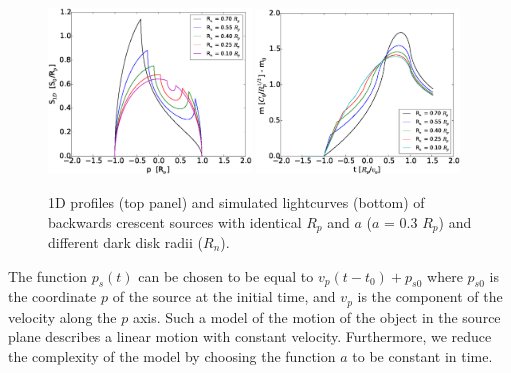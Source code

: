 \documentclass[usenatbib]{mn2e}
\begin{document}
\begin{figure}
\centering
    \includegraphics[width = 0.48\textwidth]{figures/S1D_var_rn_a_poz.eps}
    \includegraphics[width = 0.48\textwidth]{figures/5Rn_back_var_magnification.eps}
\caption{\label{fig:lightcurve_crescent_back} 1D profiles (top panel) and simulated lightcurves (bottom) of backwards crescent sources with identical $R_p$ and $a$ ($a$ = 0.3 $R_p$) and different dark disk radii ($R_n$).}
\end{figure}

The function $p_s(t)$ can be chosen to be equal to $v_p(t-t_0) + p_{s0}$ where $p_{s0}$ is the coordinate $p$ 
of the source at the initial time, and $v_p$ is the component of the velocity
along the $p$ axis. Such a model of the motion of the object in the source 
plane describes a linear motion with constant velocity. Furthermore, we reduce the complexity of the model by 
choosing the function $a$ to be constant in time.  
\end{document}
